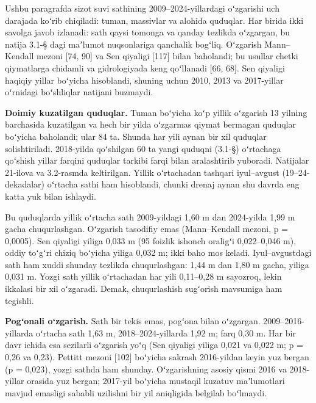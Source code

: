 
Ushbu paragrafda sizot suvi sathining 2009--2024-yillardagi oʻzgarishi
uch darajada koʻrib chiqiladi: tuman, massivlar va alohida quduqlar. Har
birida ikki savolga javob izlanadi: sath qaysi tomonga va qanday
tezlikda oʻzgargan, bu natija 3.1-§ dagi maʼlumot nuqsonlariga qanchalik
bogʻliq. Oʻzgarish Mann--Kendall mezoni {[}74, 90{]} va Sen qiyaligi
{[}117{]} bilan baholandi; bu usullar chetki qiymatlarga chidamli va
gidrologiyada keng qoʻllanadi {[}66, 68{]}. Sen qiyaligi haqiqiy yillar
boʻyicha hisoblandi, shuning uchun 2010, 2013 va 2017-yillar oʻrnidagi
boʻshliqlar natijani buzmaydi.

\textbf{Doimiy kuzatilgan quduqlar.} Tuman boʻyicha koʻp yillik
oʻzgarish 13 yilning barchasida kuzatilgan va hech bir yilda oʻzgarmas
qiymat bermagan quduqlar boʻyicha baholandi; ular 84 ta. Shunda har yili
aynan bir xil quduqlar solishtiriladi. 2018-yilda qoʻshilgan 60 ta yangi
quduqni (3.1-§) oʻrtachaga qoʻshish yillar farqini quduqlar tarkibi
farqi bilan aralashtirib yuboradi. Natijalar 21-ilova va 3.2-rasmda
keltirilgan. Yillik oʻrtachadan tashqari iyul--avgust (19--24-dekadalar)
oʻrtacha sathi ham hisoblandi, chunki drenaj aynan shu davrda eng katta
yuk bilan ishlaydi.

Bu quduqlarda yillik oʻrtacha sath 2009-yildagi 1,60 m dan 2024-yilda
1,99 m gacha chuqurlashgan. Oʻzgarish tasodifiy emas (Mann--Kendall
mezoni, p = 0,0005). Sen qiyaligi yiliga 0,033 m (95 foizlik ishonch
oraligʻi 0,022--0,046 m), oddiy toʻgʻri chiziq boʻyicha yiliga 0,032 m;
ikki baho mos keladi. Iyul--avgustdagi sath ham xuddi shunday tezlikda
chuqurlashgan: 1,44 m dan 1,80 m gacha, yiliga 0,031 m. Yozgi sath
yillik oʻrtachadan har yili 0,11--0,28 m sayozroq, lekin ikkalasi bir
xil oʻzgaradi. Demak, chuqurlashish sugʻorish mavsumiga ham tegishli.



\textbf{Pogʻonali oʻzgarish.} Sath bir tekis emas, pogʻona bilan
oʻzgargan. 2009--2016-yillarda oʻrtacha sath 1,63 m, 2018--2024-yillarda
1,92 m; farq 0,30 m. Har bir davr ichida esa sezilarli oʻzgarish yoʻq
(Sen qiyaligi yiliga 0,021 va 0,022 m; p = 0,26 va 0,23). Pettitt mezoni
{[}102{]} boʻyicha sakrash 2016-yildan keyin yuz bergan (p = 0,023),
yozgi sathda ham shunday. Oʻzgarishning asosiy qismi 2016 va 2018-yillar
orasida yuz bergan; 2017-yil boʻyicha mustaqil kuzatuv maʼlumotlari
mavjud emasligi sababli uzilishni bir yil aniqligida belgilab boʻlmaydi.

